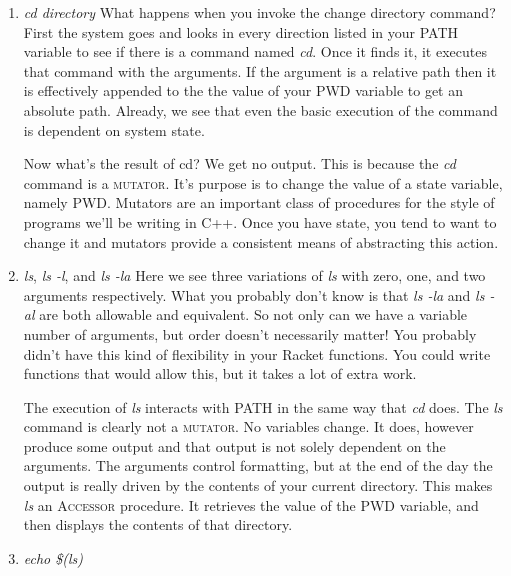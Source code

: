 \documentclass[nobib]{tufte-handout}
\begin{document}
\begin{enumerate}
\item \textit{cd \textit{directory}} \newline
What happens when you invoke the change directory command? First the system goes and looks in every direction listed in your PATH variable to see if there is a command named \textit{cd}. Once it finds it, it executes that command with the arguments.  If the argument is a relative path then it is effectively appended to the the value of your PWD variable to get an absolute path. Already, we see that even the basic execution of the command is dependent on system state.

Now what's the result of cd? We get no output. This is because the \textit{cd} command is a \textsc{mutator}. It's purpose is to change the value of a state variable, namely PWD\@. Mutators are an important class of procedures for the style of programs we'll be writing in C++. Once you have state, you tend to want to change it and mutators provide a consistent means of abstracting this action.


\item \textit{ls}, \textit{ls -l}, and \textit{ls -la} \newline
Here we see three variations of \textit{ls} with zero, one, and two arguments respectively.  What you probably don't know is that \textit{ls -la} and \textit{ls -al}  are both allowable and equivalent. So not only can we have a variable number of arguments, but order doesn't necessarily matter! You probably didn't have this kind of flexibility in your Racket functions.  You could write functions that would allow this, but it takes a lot of extra work.

The execution of \textit{ls} interacts with PATH in the same way that \textit{cd} does. The \textit{ls} command is clearly not a \textsc{mutator}. No variables change. It does, however produce some output and that output is not solely dependent on the arguments.  The arguments control formatting, but at the end of the day the output is really driven by the contents of your current directory. This makes \textit{ls} an \textsc{Accessor} procedure. It retrieves the value of the PWD variable, and then displays the contents of that directory.

\item \textit{echo \$(ls)} \newline


\end{enumerate}
\end{document}
